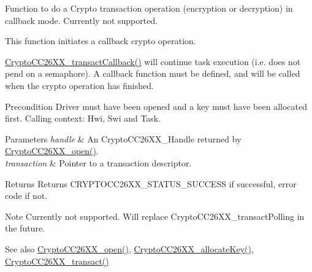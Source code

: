 Function to do a Crypto transaction operation (encryption or decryption) in callback mode. Currently not supported. 

This function initiates a callback crypto operation.

\hyperlink{_crypto_c_c26_x_x_8h_a99eb096ad8f78acf23d4e4b75616dc95}{Crypto\+C\+C26\+X\+X\+\_\+transact\+Callback()} will continue task execution (i.\+e. does not pend on a semaphore). A callback function must be defined, and will be called when the crypto operation has finished.

\begin{DoxyPrecond}{Precondition}
Driver must have been opened and a key must have been allocated first. Calling context\+: Hwi, Swi and Task.
\end{DoxyPrecond}

\begin{DoxyParams}{Parameters}
{\em handle} & An Crypto\+C\+C26\+X\+X\+\_\+\+Handle returned by \hyperlink{_crypto_c_c26_x_x_8h_a21aa1458d0b063ee3637a40487e8ee12}{Crypto\+C\+C26\+X\+X\+\_\+open()}.\\
\hline
{\em transaction} & Pointer to a transaction descriptor.\\
\hline
\end{DoxyParams}
\begin{DoxyReturn}{Returns}
Returns C\+R\+Y\+P\+T\+O\+C\+C26\+X\+X\+\_\+\+S\+T\+A\+T\+U\+S\+\_\+\+S\+U\+C\+C\+E\+S\+S if successful, error code if not.
\end{DoxyReturn}
\begin{DoxyNote}{Note}
Currently not supported. Will replace Crypto\+C\+C26\+X\+X\+\_\+transact\+Polling in the future.
\end{DoxyNote}
\begin{DoxySeeAlso}{See also}
\hyperlink{_crypto_c_c26_x_x_8h_a21aa1458d0b063ee3637a40487e8ee12}{Crypto\+C\+C26\+X\+X\+\_\+open()}, \hyperlink{_crypto_c_c26_x_x_8h_a50d5828043e87fd37398d2aabe9b9e92}{Crypto\+C\+C26\+X\+X\+\_\+allocate\+Key()}, \hyperlink{_crypto_c_c26_x_x_8h_a6864191d34a9a3cfbcd36cc34570b3b8}{Crypto\+C\+C26\+X\+X\+\_\+transact()} 
\end{DoxySeeAlso}
